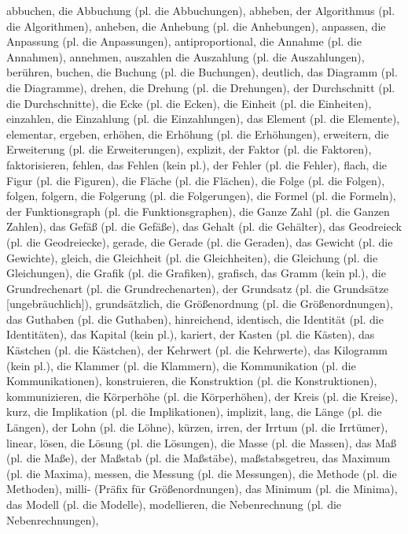 abbuchen,
die Abbuchung (pl. die Abbuchungen),
abheben,
der Algorithmus (pl. die Algorithmen),
anheben,
die Anhebung (pl. die Anhebungen),
anpassen,
die Anpassung (pl. die Anpassungen),
antiproportional,
die Annahme (pl. die Annahmen),
annehmen,
auszahlen
die Auszahlung (pl. die Auszahlungen),
berühren,
buchen,
die Buchung (pl. die Buchungen),
deutlich,
das Diagramm (pl. die Diagramme),
drehen,
die Drehung (pl. die Drehungen),
der Durchschnitt (pl. die Durchschnitte),
die Ecke (pl. die Ecken),
die Einheit (pl. die Einheiten),
einzahlen,
die Einzahlung (pl. die Einzahlungen),
das Element (pl. die Elemente),
elementar,
ergeben,
erhöhen,
die Erhöhung (pl. die Erhöhungen),
erweitern,
die Erweiterung (pl. die Erweiterungen),
explizit,
der Faktor (pl. die Faktoren),
faktorisieren,
fehlen,
das Fehlen (kein pl.),
der Fehler (pl. die Fehler),
flach,
die Figur (pl. die Figuren),
die Fläche (pl. die Flächen),
die Folge (pl. die Folgen),
folgen,
folgern,
die Folgerung (pl. die Folgerungen),
die Formel (pl. die Formeln),
der Funktionsgraph (pl. die Funktionsgraphen),
die Ganze Zahl (pl. die Ganzen Zahlen),
das Gefäß (pl. die Gefäße),
das Gehalt (pl. die Gehälter),
das Geodreieck (pl. die Geodreiecke),
gerade,
die Gerade (pl. die Geraden),
das Gewicht (pl. die Gewichte),
gleich,
die Gleichheit (pl. die Gleichheiten),
die Gleichung (pl. die Gleichungen),
die Grafik (pl. die Grafiken),
grafisch,
das Gramm (kein pl.),
die Grundrechenart (pl. die Grundrechenarten),
der Grundsatz (pl. die Grundsätze [ungebräuchlich]),
grundsätzlich,
die Größenordnung (pl. die Größenordnungen),
das Guthaben (pl. die Guthaben),
hinreichend,
identisch,
die Identität (pl. die Identitäten),
das Kapital (kein pl.),
kariert,
der Kasten (pl. die Kästen),
das Kästchen (pl. die Kästchen),
der Kehrwert (pl. die Kehrwerte),
das Kilogramm (kein pl.),
die Klammer (pl. die Klammern),
die Kommunikation (pl. die Kommunikationen),
konstruieren,
die Konstruktion (pl. die Konstruktionen),
kommunizieren,
die Körperhöhe (pl. die Körperhöhen),
der Kreis (pl. die Kreise),
kurz,
die Implikation (pl. die Implikationen),
implizit,
lang,
die Länge (pl. die Längen),
der Lohn (pl. die Löhne),
kürzen,
irren,
der Irrtum (pl. die Irrtümer),
linear,
lösen,
die Lösung (pl. die Lösungen),
die Masse (pl. die Massen),
das Maß (pl. die Maße),
der Maßstab (pl. die Maßstäbe),
maßstabsgetreu,
das Maximum (pl. die Maxima),
messen,
die Messung (pl. die Messungen),
die Methode (pl. die Methoden),
milli- (Präfix für Größenordnungen),
das Minimum (pl. die Minima),
das Modell (pl. die Modelle),
modellieren,
die Nebenrechnung (pl. die Nebenrechnungen),
